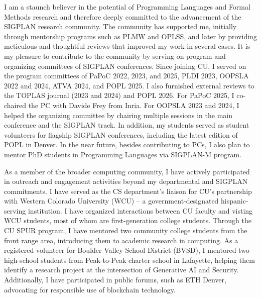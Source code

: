 \vspace*{0.15in}
 I am a staunch believer in the potential
of Programming Languages and Formal Methods research and therefore deeply
committed to the advancement of the SIGPLAN research community. The
community has supported me, initially through mentorship programs such as
PLMW and OPLSS, and later by providing meticulous and thoughtful reviews
that improved my work in several cases. It is my pleasure to contribute to
the community by serving on program and organizing committees of SIGPLAN
conferences. Since joining CU, I served on the program committees of PaPoC
2022, 2023, and 2025, PLDI 2023, OOPSLA 2022 and 2024, ATVA 2024, and POPL
2025. I also furnished external reviews to the TOPLAS journal (2023 and
2024) and POPL 2026. For PaPoC 2025, I co-chaired the PC with Davide Frey
from Inria. For OOPSLA 2023 and 2024, I helped the organizing committee by
chairing multiple sessions in the main conference and the SIGPLAN track. In
addition, my students served as student volunteers for flagship SIGPLAN
conferences, including the latest edition of POPL in Denver. In the near
future, besides contributing to PCs, I also plan to mentor PhD students in
Programming Languages via SIGPLAN-M program. 

\vspace*{0.15in}
 As a member of the broader
computing community, I have actively participated in outreach and
engagement activities beyond my departmental and SIGPLAN commitments. I
have served as the CS department's liaison for CU's partnership with
Western Colorado University (WCU) -- a government-designated
hispanic-serving institution. I have organized interactions between CU
faculty and visting WCU students, most of whom are first-generation college
students. Through the CU SPUR program, I have mentored two community
college students from the front range area, introducing them to academic
research in computing. As a registered volunteer for Boulder Valley School
District (BVSD), I mentored two high-school students from Peak-to-Peak
charter school in Lafayette, helping them identify a research project at
the intersection of Generative AI and Security. Additionally, I have
participated in public forums, such as ETH Denver, advocating for
responsible use of blockchain technology.